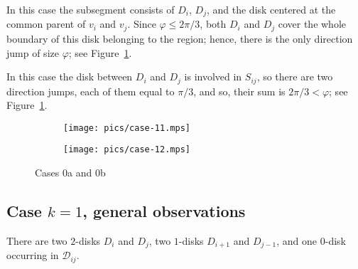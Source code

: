 \begin{enumerate}[label={\bf Case \arabic*: }, wide, labelwidth=!, labelindent=0pt]

In this case the subsegment consists of $D_i$, $D_j$, and the disk centered at the common parent of $v_i$ and $v_j$. Since $\varphi\leq 2\pi/3$, both $D_i$ and $D_j$ cover the whole boundary of this disk belonging to the region; hence, there is the only direction jump of size $\varphi$; see Figure~\ref{fig:0a_0b}.



In this case the disk between $D_i$ and $D_j$ is involved in $S_{ij}$, so there are two direction jumps, each of them equal to $\pi/3$, and so, their sum is $2\pi/3 < \varphi$; see Figure~\ref{fig:0a_0b}.

\begin{figure}[h!]
    \centering
    \begin{subfigure}{.4\textwidth}
    \texttt{[image: pics/case-11.mps]}
    \end{subfigure}
    \begin{subfigure}{.5\textwidth}
    \texttt{[image: pics/case-12.mps]}
    \end{subfigure}
    \caption{Cases 0a and 0b}
    \label{fig:0a_0b}
\end{figure}

\subsection{Case $k = 1$, general observations}


There are two $2$-disks $D_i$ and $D_j$, two $1$-disks $D_{i+1}$ and $D_{j-1}$, and one $0$-disk occurring in $\mathcal{D}_{ij}$.


\end{enumerate}
